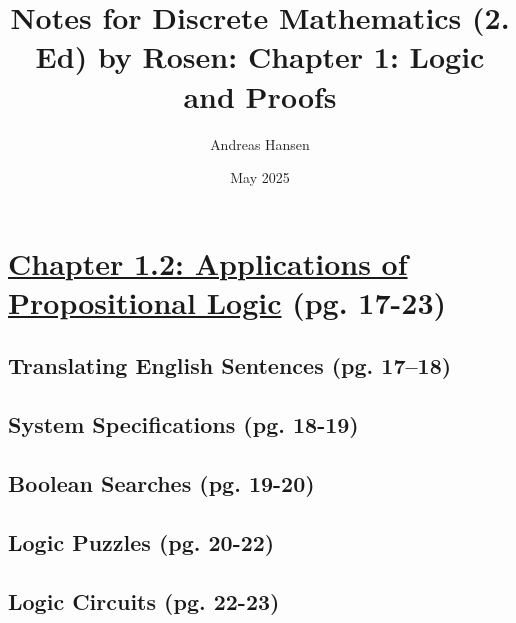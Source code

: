 \documentclass{article}
\title{Notes for Discrete Mathematics (2. Ed) by Rosen: Chapter 1: Logic and Proofs}
\author{Andreas Hansen}
\date{May 2025}
\numberwithin{equation}{section}
\numberwithin{equation}{subsection}
\begin{document}
\maketitle

\section*{\underline{Chapter 1.2: Applications of Propositional Logic} (pg. 17-23)}
\subsection*{Translating English Sentences (pg. 17–18)}


\subsection*{System Specifications (pg. 18-19)}


\newpage
\subsection*{Boolean Searches (pg. 19-20)}


\newpage
\subsection*{Logic Puzzles (pg. 20-22)}


\newpage
\subsection*{Logic Circuits (pg. 22-23)}

\end{document}
